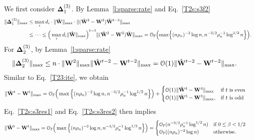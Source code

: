 \documentclass[10pt,journal,compsoc]{IEEEtran}
\newcommand{\op}{\mathcal{O}_{\mathbb{P}}}
\newcommand{\ee}{\end{aligned} \end{equation}}
\newcommand{\bds}{\boldsymbol}
\newcommand{\W}{\M W}
\newcommand{\HW}{\hat{\M W}}
\newcommand{\BL}{\Big (}
\newcommand{\BR}{\Big )}
\newcommand{\bee}{\begin{equation}\begin{aligned}}
\newcommand{\M}[1]{{{\mathbf{\MakeUppercase{#1}}}}}
\numberwithin{equation}{section}
\begin{document}
We first consider $\M\Delta^{(3)}_1$. By Lemma~\ref{l:sparse:rate} and Eq.~\eqref{T2s:s3f2}
\bee\label{T23s:res1}
\|\M \Delta^{(3)}_1\|_{\max} 
&\leq \max_i d_i \cdot \|\HW\|_{\max}\cdot\|(\HW^2 - \W^2)\HW^{t-3}\|_{\max}
\\
&\leq \dots
\leq \Big(\max_i d_i  \|\HW\|_{\max}\Big)^{t - 3} \|(\HW^2-\W^2)\HW\|_{\max}
=\op\Bigl(\max\Bigl\{(n\rho_n)^{-2}\log
n,n^{-3/2}\rho_n^{-1}\log^{1/2}{n}\Bigr\}\Bigr).
\ee
For $\M \Delta^{(3)}_2$, by Lemma~\ref{l:sparse:rate}
\bee\label{T23s:res2}
\|\M \Delta^{(3)}_2\|_{\max} 
&\leq n\cdot \|\M W^2\|_{\max}\|\hat{\M W}^{t - 2} - \M W^{t - 2}\|_{\max}
 = \mathcal{O}(1)\|\hat{\M W}^{t - 2} - \M W^{t - 2}\|_{\max}.
\ee
Similar to Eq.~\eqref{T23:ite}, we obtain
\bee
\|\HW^{t} - \W^{t}\|_{\max}
&= 
\op\Big(\max\Big\{(n\rho_n)^{-2}\log
n,n^{-3/2}\rho_n^{-1} \log^{1/2}{n} \Big\}\Big) + 
\begin{cases} 
\mathcal{O}(1)\|\hat{\M W}^{4} - \M W^{4}\|_{\max} & \text{if $t$ is even} \\
\mathcal{O}(1)\|\hat{\M W}^3 - \M W^3\|_{\max}, & \text{if $t$ is odd}
\end{cases}
\ee
Eq.~\eqref{T2s:s3res1} and
Eq.~\eqref{T2s:s3res2} then implies
\bee\nonumber
\|\HW^{t} - \W^{t}\|_{\max} 
&= \op\Big(\max\Big\{(n\rho_n)^{-2}\log
n,n^{-3/2}\rho_n^{-1} \log^{1/2}{n}\Big\}\Big)
=\begin{cases}
\op(n^{-3/2}\rho_n^{-1}\log^{1/2}{n}) & \text{if $0\leq \beta <1/2$}
\\
\op((n\rho_n)^{-2}\log n) & \text{otherwise.}
\end{cases}
\ee
\end{document}
